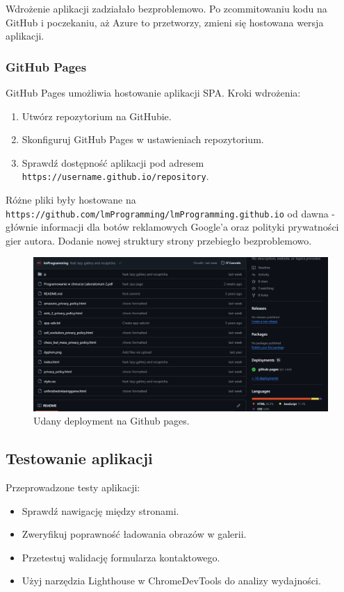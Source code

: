 \documentclass[a4paper,12pt]{article}
\begin{document}
Wdrożenie aplikacji zadziałało bezproblemowo. Po zcommitowaniu kodu na GitHub i poczekaniu, aż Azure to przetworzy, zmieni się hostowana wersja aplikacji.

\subsubsection{GitHub Pages}
GitHub Pages umożliwia hostowanie aplikacji SPA. Kroki wdrożenia:
\begin{enumerate}
    \item Utwórz repozytorium na GitHubie.
    \item Skonfiguruj GitHub Pages w ustawieniach repozytorium.
    \item Sprawdź dostępność aplikacji pod adresem \texttt{https://username.github.io/repository}.
\end{enumerate}

Różne pliki były hostowane na \texttt{https://github.com/lmProgramming/lmProgramming.github.io} od dawna - głównie informacji dla botów reklamowych Google'a oraz polityki prywatności gier autora. Dodanie nowej struktury strony przebiegło bezproblemowo.

\begin{figure}[H]
    \centering
    \includegraphics[width=1\textwidth]{images/github.png}
    \caption{Udany deployment na Github pages.}
\end{figure}

\subsection{Testowanie aplikacji}
Przeprowadzone testy aplikacji:
\begin{itemize}
    \item Sprawdź nawigację między stronami.
    \item Zweryfikuj poprawność ładowania obrazów w galerii.
    \item Przetestuj walidację formularza kontaktowego.
    \item Użyj narzędzia Lighthouse w ChromeDevTools do analizy wydajności.
\end{itemize}
\end{document}
